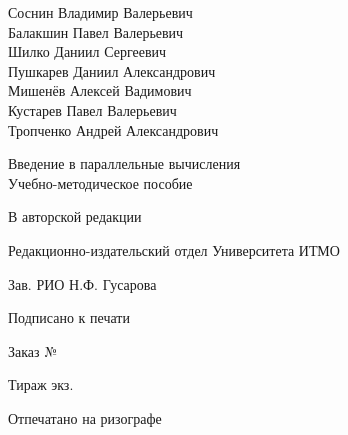 \thispagestyle{empty}

\vspace*{\fill}

\begin{center}
    Соснин Владимир Валерьевич \\
    Балакшин Павел Валерьевич \\
    Шилко Даниил Сергеевич \\
    Пушкарев Даниил Александрович \\
    Мишенёв Алексей Вадимович \\
    Кустарев Павел Валерьевич \\
    Тропченко Андрей Александрович
\\[2\baselineskip]
\begin{bfseries}
    {\large Введение в параллельные вычисления}
    \\[\baselineskip]
    Учебно-методическое пособие
\end{bfseries}

\end{center}

\vspace*{\fill}

\noindent
В авторской редакции

\noindent
Редакционно-издательский отдел Университета ИТМО

\noindent
Зав. РИО \hfill Н.Ф. Гусарова

\noindent
Подписано к печати

\noindent
Заказ №

\noindent
Тираж \qquad \quad экз.

\noindent
Отпечатано на ризографе